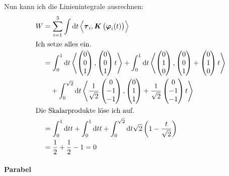 \documentclass[11pt, ngerman, fleqn]{article}
\newcommand{\half}{\frac 12}
\newcommand{\inner}[2]{\left\langle #1, #2 \right\rangle}
\renewcommand{\vec}[1]{\boldsymbol{#1}}
\begin{document}
Nun kann ich die Linienintegrale ausrechnen:
\begin{align*}
	W &=
	\sum_{i=1}^3 \int \dif t \inner{\vec \tau_i}{\vec K \del{\vec\varphi_i(t)}} \\
	\intertext{Ich setze alles ein.}
	&=
	\int_0^1 \dif t \inner{\begin{pmatrix}
			0 \\ 0 \\ 1
	\end{pmatrix}}{\begin{pmatrix}
			0 \\ 0 \\ 1
	\end{pmatrix} t}
	+
	\int_0^1 \dif t \inner{\begin{pmatrix}
			0 \\ 1 \\ 0
	\end{pmatrix}}{\begin{pmatrix}
			0 \\ 0 \\ 1
		\end{pmatrix} + \begin{pmatrix}
			0 \\ 1 \\ 0
	\end{pmatrix} t} \\
	&\quad+
	\int_0^{\sqrt{2}} \dif t \inner{\frac 1{\sqrt{2}} \begin{pmatrix}
		0 \\ -1 \\ -1 \end{pmatrix}}{\begin{pmatrix}
				0 \\ 1 \\ 1
			\end{pmatrix} + \frac{1}{\sqrt{2}} \begin{pmatrix}
				0 \\ -1 \\ -1
		\end{pmatrix} t} \\
		\intertext{Die Skalarprodukte löse ich auf.}
		&= \int_0^1 \dif t t
		+\int_0^1 \dif t t
		+\int_0^{\sqrt{2}} \dif t \sqrt{2} \del{1-\frac t{\sqrt{2}}} \\
		&= \half + \half -1 = 0
	\end{align*}

	\paragraph{Parabel}
\end{document}
